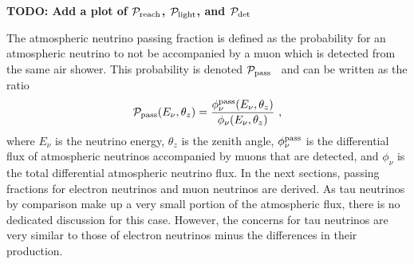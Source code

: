 \textbf{TODO: Add a plot of ${\cal P}_{\rm reach}$, ${\cal P}_{\rm light}$, and ${\cal P}_{\rm det}$}

The atmospheric neutrino passing fraction is defined as the probability for an atmospheric neutrino to not be accompanied by a muon which is detected from the same air shower. This probability is denoted ${\cal P}_{\rm pass}$~\cite{Schonert:2008is, Gaisser:2014bja} and can be written as the ratio
\begin{equation}
{\cal P}_{\rm pass} (E_\nu, \theta_z) = \frac{\phi_\nu^{\rm pass}(E_\nu, \theta_z)}{\phi_\nu(E_\nu, \theta_z)} ~,
\end{equation}
where $E_\nu$ is the neutrino energy, $\theta_z$ is the zenith angle, $\phi_\nu^{\rm pass}$ is the differential flux of atmospheric neutrinos accompanied by muons that are detected, and $\phi_\nu$ is the total differential atmospheric neutrino flux.
In the next sections, passing fractions for electron neutrinos and muon neutrinos are derived.
As tau neutrinos by comparison make up a very small portion of the atmospheric flux, there is no dedicated discussion for this case.
However, the concerns for tau neutrinos are very similar to those of electron neutrinos minus the differences in their production.

